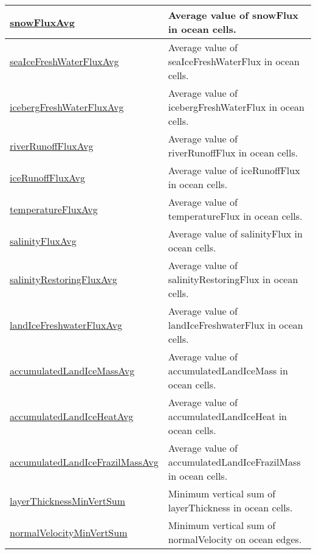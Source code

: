 {\begin{center}
\begin{longtable}{| p{2.0in} | p{4.0in} |}
    \hline
    \hyperref[subsec:var_sec_globalStatsAM_snowFluxAvg]{snowFluxAvg} & Average value of snowFlux in ocean cells. \\
    \hline
    \hyperref[subsec:var_sec_globalStatsAM_seaIceFreshWaterFluxAvg]{seaIceFreshWaterFluxAvg} & Average value of seaIceFreshWaterFlux in ocean cells. \\
    \hline
    \hyperref[subsec:var_sec_globalStatsAM_icebergFreshWaterFluxAvg]{icebergFreshWaterFluxAvg} & Average value of icebergFreshWaterFlux in ocean cells. \\
    \hline
    \hyperref[subsec:var_sec_globalStatsAM_riverRunoffFluxAvg]{riverRunoffFluxAvg} & Average value of riverRunoffFlux in ocean cells. \\
    \hline
    \hyperref[subsec:var_sec_globalStatsAM_iceRunoffFluxAvg]{iceRunoffFluxAvg} & Average value of iceRunoffFlux in ocean cells. \\
    \hline
    \hyperref[subsec:var_sec_globalStatsAM_temperatureFluxAvg]{temperatureFluxAvg} & Average value of temperatureFlux in ocean cells. \\
    \hline
    \hyperref[subsec:var_sec_globalStatsAM_salinityFluxAvg]{salinityFluxAvg} & Average value of salinityFlux in ocean cells. \\
    \hline
    \hyperref[subsec:var_sec_globalStatsAM_salinityRestoringFluxAvg]{salinityRestoringFluxAvg} & Average value of salinityRestoringFlux in ocean cells. \\
    \hline
    \hyperref[subsec:var_sec_globalStatsAM_landIceFreshwaterFluxAvg]{landIceFreshwaterFluxAvg} & Average value of landIceFreshwaterFlux in ocean cells. \\
    \hline
    \hyperref[subsec:var_sec_globalStatsAM_accumulatedLandIceMassAvg]{accumulatedLandIceMassAvg} & Average value of accumulatedLandIceMass in ocean cells. \\
    \hline
    \hyperref[subsec:var_sec_globalStatsAM_accumulatedLandIceHeatAvg]{accumulatedLandIceHeatAvg} & Average value of accumulatedLandIceHeat in ocean cells. \\
    \hline
    \hyperref[subsec:var_sec_globalStatsAM_accumulatedLandIceFrazilMassAvg]{accumulatedLandIceFrazilMass\-Avg} & Average value of accumulatedLandIceFrazilMass in ocean cells. \\
    \hline
    \hyperref[subsec:var_sec_globalStatsAM_layerThicknessMinVertSum]{layerThicknessMinVertSum} & Minimum vertical sum of layerThickness in ocean cells. \\
    \hline
    \hyperref[subsec:var_sec_globalStatsAM_normalVelocityMinVertSum]{normalVelocityMinVertSum} & Minimum vertical sum of normalVelocity on ocean edges. \\

\end{longtable}
\end{center}}
